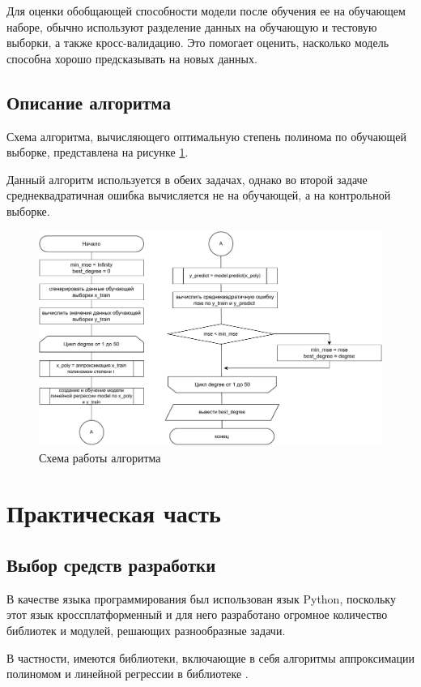 \documentclass[12pt]{report}
\begin{document}
Для оценки обобщающей способности модели после обучения ее на обучающем наборе, обычно используют разделение данных на обучающую и тестовую выборки, а также кросс-валидацию. Это помогает оценить, насколько модель способна хорошо предсказывать на новых данных.

\section{Описание алгоритма}
Схема алгоритма, вычисляющего оптимальную степень полинома по обучающей выборке, представлена на рисунке \ref{fig:algo_gen}. 

Данный алгоритм используется в обеих задачах, однако во второй задаче среднеквадратичная ошибка вычисляется не на обучающей, а на контрольной выборке.

\begin{figure}[h!]
  \centering
  \includegraphics[width = \linewidth]{mml_lab_01.pdf}
  \caption{Схема работы алгоритма}
  \label{fig:algo_gen}
\end{figure}


\chapter{Практическая часть}

\section{Выбор средств разработки}
В качестве языка программирования был использован язык Python, поскольку этот язык кроссплатформенный и для него разработано огромное количество библиотек и модулей, решающих разнообразные задачи. 

В частности, имеются библиотеки, включающие в себя алгоритмы аппроксимации полиномом и линейной регрессии в библиотеке \cite{bib:sklearn}.
\end{document}
